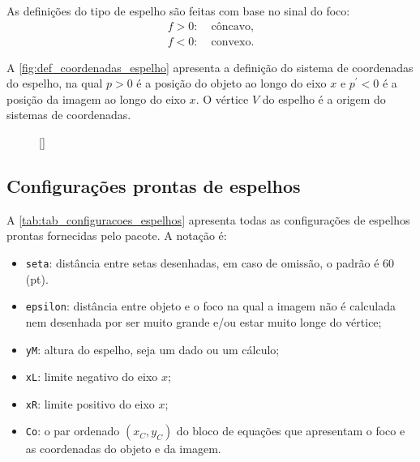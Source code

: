 \documentclass[a4paper,10pt]{article}
\begin{document}
As definições do tipo de espelho são feitas com base no sinal do foco:
\begin{equation}
  \begin{split}
    f > 0: & \; \textrm{côncavo}, \\
    f < 0: & \; \textrm{convexo}.
  \end{split}
\end{equation}

A \autoref{fig:def_coordenadas_espelho} apresenta a definição do sistema de coordenadas do espelho, na qual $p > 0$ é a posição do objeto ao longo do eixo $x$ e $p^{\prime} < 0$ é a posição da imagem ao longo do eixo $x$. O vértice $V$ do espelho é a origem do sistemas de coordenadas.

\begin{figure}[!ht]
  \centering
  [\linewidth]{
  }
\end{figure}

\subsection{Configurações prontas de espelhos}

A \autoref{tab:tab_configuracoes_espelhos} apresenta todas as configurações de espelhos prontas fornecidas pelo pacote. A notação é:
\begin{itemize}
  \item \texttt{seta}: distância entre setas desenhadas, em caso de omissão, o padrão é 60 (pt).
  \item \texttt{epsilon}: distância entre objeto e o foco na qual a imagem não é calculada nem desenhada por ser muito grande e/ou estar muito longe do vértice;
  \item \texttt{yM}: altura do espelho, seja um dado ou um cálculo;
  \item \texttt{xL}: limite negativo do eixo $x$;
  \item \texttt{xR}: limite positivo do eixo $x$;
  \item \texttt{Co}: o par ordenado $(x_C,y_C)$ do bloco de equações que apresentam o foco e as coordenadas do objeto e da imagem.
\end{itemize}
\end{document}
